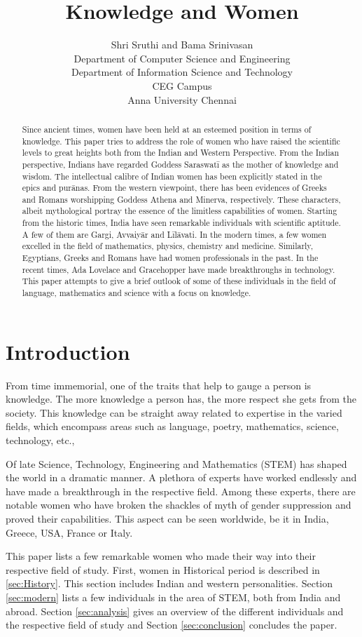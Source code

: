 \documentclass[a4paper,10pt]{article}
\title{Knowledge and Women}
\author{Shri Sruthi and Bama Srinivasan \\  Department of Computer Science and Engineering \\  Department of Information Science and Technology \\ CEG Campus \\Anna University Chennai}
\date{}
\begin{document}
\maketitle

\begin{abstract}
Since ancient times, women have been held at an esteemed position in terms of knowledge. This paper tries to address the role of women who have raised the scientific levels to great heights both from the Indian and Western Perspective. From the Indian perspective, Indians have regarded Goddess Saraswat\={i} as the mother of knowledge and wisdom. The intellectual calibre of Indian women has been explicitly stated in the epics and pur\={a}nas. From the western viewpoint,  there has been evidences of Greeks and Romans worshipping Goddess Athena and Minerva, respectively. These characters, albeit mythological portray the essence of the limitless capabilities of women. Starting from the historic times, India have seen remarkable individuals with scientific aptitude. A few of them are Gargi, Avvaiy\={a}r and L\={i}l\={a}vati. In the modern times, a few women excelled in the field of mathematics, physics, chemistry and medicine. Similarly, Egyptians, Greeks and Romans have had women professionals in the past. In 
the recent times, Ada Lovelace and Gracehopper have made breakthroughs in technology. This paper attempts to give a brief outlook of some of these individuals in the field of language, mathematics and science with a focus on knowledge. 
\end{abstract}
\section{Introduction}
From time immemorial, one of the traits that help to gauge a person is knowledge. The more knowledge a person has, the more respect she gets from the society. This knowledge can be straight away related to expertise in the varied fields, which encompass areas such as language, poetry, mathematics, science, technology, etc., 

Of late Science, Technology, Engineering and Mathematics (STEM) has shaped the world in a dramatic manner. A plethora of experts have worked endlessly and have made a breakthrough in the respective field. Among these experts, there are notable women who have broken the shackles of myth of gender suppression and proved their capabilities. This aspect can be seen worldwide, be it in India, Greece, USA, France or Italy. 

This paper lists a few remarkable women who made their way into their respective field of study. First, women in Historical period is described in \ref{sec:History}. This section includes Indian and western personalities. Section \ref{sec:modern} lists a few individuals in the area of STEM, both from India and abroad. Section \ref{sec:analysis} gives an overview of the different individuals and the respective field of study and Section \ref{sec:conclusion} concludes the paper. 
\end{document}
